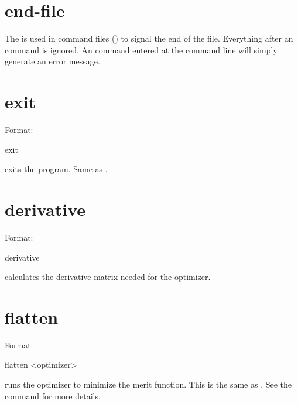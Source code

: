 \section{end-file}
\label{s:end.file}

The  is used in command files () to signal
the end of the file. Everything after an  command is
ignored. An  command entered at the command line will
simply generate an error message.

\section{exit}
\label{s:exit}

Format:
\begin{example}
  exit
\end{example}

\vskip 0.2in
 exits the program. Same as .

\section{derivative}
\label{s:deriv}

Format:
\begin{example}
  derivative
\end{example}

\vskip 0.2in 
 calculates the  derivative
matrix needed for the  optimizer.

\section{flatten}
\label{s:flatten}

Format:
\begin{example}
  flatten <optimizer>
\end{example}

\vskip 0.2in
 runs the optimizer to minimize the merit function. This is the 
same as . See the  command for more details.

